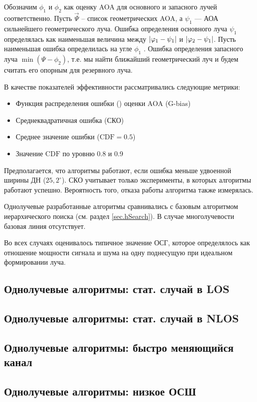 Обозначим $\phi_1$ и $\phi_2$ как оценку AOA для основного и запасного лучей соответственно. 
Пусть $\vec \Psi$ -- список геометрических AOA, а $\psi_1$ —
АОА сильнейшего геометрического луча. 
Ошибка определения основного луча $\psi_1$ определялась как наименьшая величина 
между $\abs{\varphi_1 - \psi_1}$ и  $\abs{\varphi_2 - \psi_1}$. 
Пусть наименьшая ошибка определилась на угле $\phi_1$ .
Ошибка определения запасного луча   $\min(\Psi - \phi_2)$, 
т.е. мы найти ближайший геометрический луч и будем считать его опорным для
резервного луча.  

В качестве показателей эффективности рассматривались
следующие метрики: 

\newcommand\CDF{}
\begin{itemize}
    \item Функция распределения ошибки (\CDF) оценки AOA (G-bias)
    \item Среднеквадратичная ошибка (СКО)
    \item Среднее значение ошибки ($\CDF = 0.5$)
    \item Значение $\CDF$ по уровню 0.8 и 0.9
\end{itemize}

Предполагается, что алгоритмы работают, если ошибка меньше удвоенной ширины
ДН ($25,2^{\circ}$).  СКО учитывает только эксперименты, в которых 
алгоритмы работают успешно. 
Вероятность того, отказа работы алгоритма также измерялась.  

Однолучевые  разработанные алгоритмы сравнивались с
базовым алгоритмом иерархического поиска (см.  раздел \ref{sec.hSearch}). 
В случае многолучевости базовая линия отсутствует.  

Во всех случаях оценивалось типичное значение ОСГ, которое определялось
как отношение мощности сигнала и шума на одну поднесущую при идеальном
формировании луча.

\subsection{Однолучевые алгоритмы: стат. случай в LOS}
\subsection{Однолучевые алгоритмы: стат. случай в NLOS}
\subsection{Однолучевые алгоритмы: быстро меняющийся канал}
\subsection{Однолучевые алгоритмы: низкое ОСШ}

